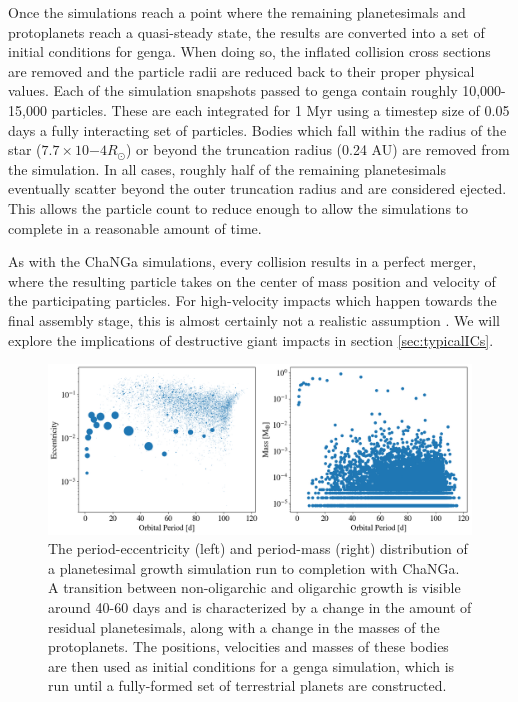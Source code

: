 Once the simulations reach a point where the remaining planetesimals and protoplanets reach a quasi-steady state, the results are converted into a set of initial conditions for {\sc genga}.  When doing so, the inflated collision cross sections are removed and the particle radii are reduced back to their proper physical values. Each of the simulation snapshots passed to {\sc genga} contain roughly 10,000-15,000 particles. These are each integrated for 1 Myr using a timestep size of 0.05 days a fully interacting set of particles. Bodies which fall within the radius of the star ($7.7 \times 10{-4} R_{\odot}$) or beyond the truncation radius (0.24 AU) are removed from the simulation. In all cases, roughly half of the remaining planetesimals eventually scatter beyond the outer truncation radius and are considered ejected. This allows the particle count to reduce enough to allow the simulations to complete in a reasonable amount of time.

As with the {\sc ChaNGa} simulations, every collision results in a perfect merger, where the resulting particle takes on the center of mass position and velocity of the participating particles. For high-velocity impacts which happen towards the final assembly stage, this is almost certainly not a realistic assumption \cite{marcus09}. We will explore the implications of destructive giant impacts in section \ref{sec:typicalICs}.

\begin{figure}
\begin{center}
    \includegraphics[width=\textwidth]{figures/stip/changa_ics.png}
    \caption{The period-eccentricity (left) and period-mass (right) distribution of a planetesimal growth simulation run to completion with {\sc ChaNGa}. A transition between non-oligarchic and oligarchic growth is visible around 40-60 days and is characterized by a change in the amount of residual planetesimals, along with a change in the masses of the protoplanets. The positions, velocities and masses of these bodies are then used as initial conditions for a {\sc genga} simulation, which is run until a fully-formed set of terrestrial planets are constructed.\label{fig:changa_ics}}
\end{center}
\end{figure}

